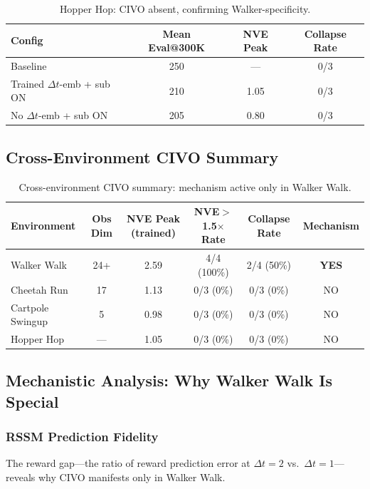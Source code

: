 \documentclass[letterpaper]{article}
\begin{document}
\begin{table}[h]
\centering
\caption{Hopper Hop: CIVO absent, confirming Walker-specificity.}
\label{tab:hopper}
\begin{tabular}{lccc}
\toprule
Config & Mean Eval@300K & NVE Peak & Collapse Rate \\
\midrule
Baseline & 250 & --- & 0/3 \\
Trained $\Delta t$-emb + sub ON & 210 & 1.05 & 0/3 \\
No $\Delta t$-emb + sub ON & 205 & 0.80 & 0/3 \\
\bottomrule
\end{tabular}
\end{table}

\subsection{Cross-Environment CIVO Summary}

\begin{table}[h]
\centering
\caption{Cross-environment CIVO summary: mechanism active only in Walker Walk.}
\label{tab:cross_env}
\begin{tabular}{lccccc}
\toprule
Environment & Obs Dim & NVE Peak (trained) & NVE$>$1.5$\times$ Rate & Collapse Rate & Mechanism \\
\midrule
Walker Walk & 24+ & 2.59 & 4/4 (100\%) & 2/4 (50\%) & \textbf{YES} \\
Cheetah Run & 17 & 1.13 & 0/3 (0\%) & 0/3 (0\%) & NO \\
Cartpole Swingup & 5 & 0.98 & 0/3 (0\%) & 0/3 (0\%) & NO \\
Hopper Hop & --- & 1.05 & 0/3 (0\%) & 0/3 (0\%) & NO \\
\bottomrule
\end{tabular}
\end{table}

\subsection{Mechanistic Analysis: Why Walker Walk Is Special}

\subsubsection{RSSM Prediction Fidelity}

The reward gap---the ratio of reward prediction error at $\Delta t=2$ vs.\ $\Delta t=1$---reveals why CIVO manifests only in Walker Walk.
\end{document}
